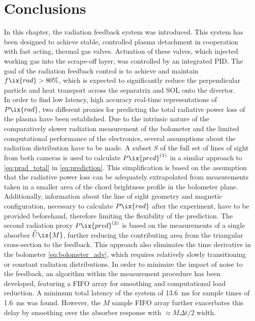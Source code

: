     \section{Conclusions}\label{sec:conclusionschap2}%
%
        In this chapter, the radiation feedback system was introduced. This system has been designed to achieve stable, controlled plasma detachment in cooperation with fast acting, thermal gas valves. Actuation of these valves, which injected working gas into the scrape-off layer, was controlled by an integrated PID. The goal of the radiation feedback control is to achieve and maintain $f\ix{rad}>80\%$, which is expected to significantly reduce the perpendicular particle and heat transport across the separatrix and SOL onto the divertor.\\%
        In order to find low latency, high accuracy real-time representations of $P\ix{rad}$, two different proxies for predicting the total radiative power loss of the plasma have been established. Due to the intrinsic nature of the comparatively slower radiation measurement of the bolometer and the limited computational performance of the electronics, several assumptions about the radiation distribution have to be made. A subset $S$ of the full set of lines of sight from both cameras is used to calculate $P\ix{pred}^{\left(1\right)}$ in a similar approach to \cref{eq:prad_total} in \cref{eq:prediction}. This simplification is based on the assumption that the radiative power loss can be adequately extrapolated from measurements taken in a smaller area of the chord brightness profile in the bolometer plane. Additionally, information about the line of sight geometry and magnetic configuration, necessary to calculate $P\ix{rad}$ after the experiment, have to be provided beforehand, therefore limiting the flexibility of the prediction. The second radiation proxy $P\ix{pred}^{\left(2\right)}$ is based on the measurements of a single absorber $\widetilde{U}\ix{M}$, further reducing the contributing area from the triangular cross-section to the feedback. This approach also eliminates the time derivative in the bolometer \cref{eq:bolometer_adv}, which requires relatively slowly transitioning or constant radiation distributions. In order to minimize the impact of noise to the feedback, an algorithm within the measurement procedure has been developed, featuring a FIFO array for smoothing and computational load reduction. A minimum total latency of the system of \SI{13.6}{\milli\second} for sample times of \SI{1.6}{\milli\second} was found. However, the $M$ sample FIFO array further exacerbates this delay by smoothing over the absorber response with $\approx M\Delta t/2$ width.\\%
